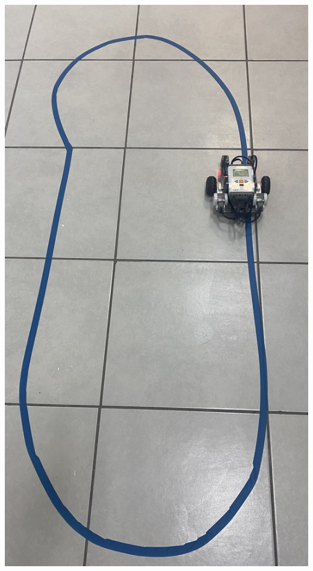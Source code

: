 \documentclass[oneside,twocolumn]{article}
\begin{document}
\includegraphics[scale=0.09]{graficos/path_robot.png}
\end{document}
